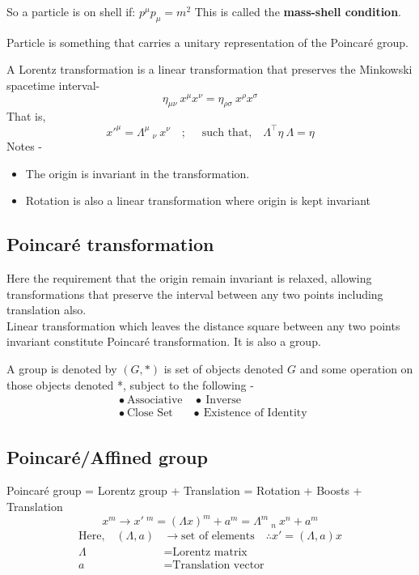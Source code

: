 \documentclass[14pt]{article} %
\begin{document}
So a particle is on shell if: $p^\mu p_\mu = m^2$
This is called the \textbf{mass-shell condition}.

\begin{tcolorbox}[ title=\textbf{Question: What is a particle?}]
Particle is something that carries a unitary representation of the Poincaré group.
\end{tcolorbox}
\begin{tcolorbox}[ title=\textbf{Question: What is Lorentz transformation?}]
A Lorentz transformation is a linear transformation that preserves the Minkowski spacetime interval-
\[
\eta_{\mu \nu} ~x^\mu x^\nu = \eta_{\rho \sigma} ~x^\rho x^\sigma 
\]
That is,
\[
x'^{\mu} = \Lambda^{\mu}~_{\nu}~x^\nu \quad;\quad \text{ such that,}\quad \Lambda^\top \eta~ \Lambda=\eta
\]
Notes -
\begin{itemize}
    \item The origin is invariant in the transformation. 
    \item Rotation is also a linear transformation where origin is kept invariant
\end{itemize}
\end{tcolorbox}
\subsection{Poincaré transformation}
Here the requirement that the origin remain invariant is relaxed, allowing transformations that preserve the interval between any two points including translation also. \\

Linear transformation which leaves the distance square between any two points invariant constitute Poincaré transformation. It is also a group.
\begin{tcolorbox}[ title=\textbf{Question: What are groups? \hfill (set + binary operation)}]
A group is denoted by $(G,*)$ is set of objects denoted $G$ and some operation on those objects denoted *, subject to the following -
\begin{align*}
&\bullet~\text{Associative} \quad \bullet~\text{Inverse} \\
&\bullet~\text{Close Set} \quad ~~~\bullet~\text{Existence of Identity }
\end{align*}
\end{tcolorbox}
\subsection{Poincaré/Affined group}
Poincaré group = Lorentz group + Translation 
= Rotation + Boosts + Translation 
\[
x^m \rightarrow x'~^m = (\Lambda x)^m + a^m = \Lambda^{m}~_{n}~x^n + a^m
\]
\begin{align*}
    \text{Here,} \quad (\Lambda, a) &\rightarrow \text{set of elements} \quad  \therefore x' = (\Lambda, a)x \\
    \Lambda &= \text{Lorentz matrix} \\
    a &= \text{Translation vector}
\end{align*}
\end{document}
